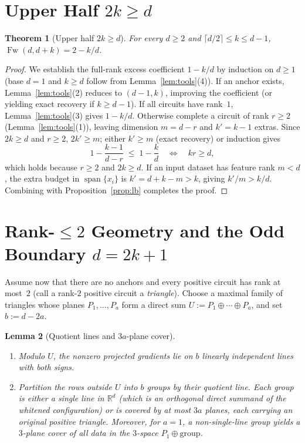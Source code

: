 \documentclass[11pt]{article}
\theoremstyle{plain}
\newtheorem{theorem}{Theorem}
\newtheorem{lemma}[theorem]{Lemma}
\theoremstyle{definition}
\theoremstyle{remark}
\DeclareMathOperator{\Fw}{Fw}
\DeclareMathOperator{\spn}{span}
\begin{document}
\section{Upper Half \texorpdfstring{$2k \ge d$}{2k >= d}}

\begin{theorem}[Upper half $2k \ge d$]\label{thm:upper}
For every $d \ge 2$ and $\lceil d/2 \rceil \le k \le d - 1$, $\Fw(d, d + k) = 2 - k/d$.
\end{theorem}

\begin{proof}
We establish the full-rank excess coefficient $1 - k/d$ by induction on $d \ge 1$ (base $d = 1$ and $k \ge d$ follow from Lemma~\ref{lem:tools}(4)).
If an anchor exists, Lemma~\ref{lem:tools}(2) reduces to $(d - 1, k)$, improving the coefficient (or yielding exact recovery if $k \ge d - 1$).
If all circuits have rank~$1$, Lemma~\ref{lem:tools}(3) gives $1 - k/d$.
Otherwise complete a circuit of rank $r \ge 2$ (Lemma~\ref{lem:tools}(1)), leaving dimension $m = d - r$ and $k' = k - 1$ extras.
Since $2k \ge d$ and $r \ge 2$, $2k' \ge m$; either $k' \ge m$ (exact recovery) or induction gives
\[
1 - \frac{k - 1}{d - r} \;\le\; 1 - \frac{k}{d} \quad\Longleftrightarrow\quad kr \ge d,
\]
which holds because $r \ge 2$ and $2k \ge d$.
If an input dataset has feature rank $m < d$, the extra budget in $\spn\{x_i\}$ is $k' = d + k - m > k$, giving $k'/m > k/d$.
Combining with Proposition~\ref{prop:lb} completes the proof.
\end{proof}

\section{Rank-\texorpdfstring{$\le 2$}{<= 2} Geometry and the Odd Boundary \texorpdfstring{$d = 2k + 1$}{d = 2k + 1}}

Assume now that there are no anchors and every positive circuit has rank at most~$2$ (call a rank-$2$ positive circuit a \emph{triangle}).
Choose a maximal family of triangles whose planes $P_1, \dots, P_a$ form a direct sum $U := P_1 \oplus \cdots \oplus P_a$, and set $b := d - 2a$.

\begin{lemma}[Quotient lines and $3a$-plane cover]\label{lem:cover}
\begin{enumerate}[label=\textup{(\arabic*)}]
\item Modulo $U$, the nonzero projected gradients lie on $b$ linearly independent lines with both signs.
\item Partition the rows outside $U$ into $b$ groups by their quotient line. Each group is either a single line in $\mathbb{R}^d$ (which is an orthogonal direct summand of the whitened configuration) or is covered by at most $3a$ planes, each carrying an original positive triangle. Moreover, for $a = 1$, a non-single-line group yields a $3$-plane cover of all data in the $3$-space $P_1 \oplus \text{group}$.
\end{enumerate}
\end{lemma}
\end{document}
